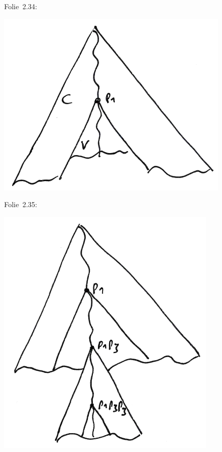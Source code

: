 \documentclass[fontsize=11pt, twoside=false, numbers=autoenddot]{scrbook}
\begin{document}
\begin{center}
  \parbox{.15\linewidth}{%
    Folie~2.34:%
  }%
  \parbox{.35\linewidth}{%
    \includegraphics[width=\linewidth]{img/t2_7c.pdf}%
  }%
  \parbox{.15\linewidth}{%
    Folie~2.35:%
  }%
  \parbox{.35\linewidth}{%
    \includegraphics[width=\linewidth]{img/t2_7d.pdf}%
  }%
\end{center}
%
%
\end{document}
